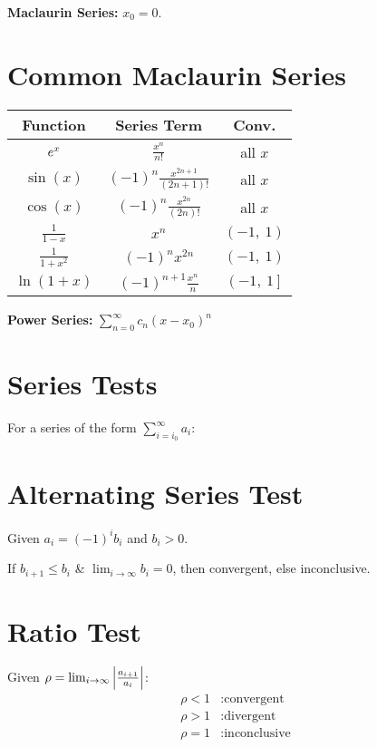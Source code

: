 \documentclass{article}
\begin{document}
\begin{multicols}{3}
    \textbf{Maclaurin Series:} $x_0 = 0$.
    \section*{Common Maclaurin Series}
    \begin{table}[H]
        \centering
        \begin{tabular}{c | c | c}
            \toprule
            \textbf{Function}         & \textbf{Series Term}                                        & \textbf{Conv.}           \\
            \midrule
            $e^{x}$                  & $\frac{x^n}{n!}$                                            & all $x$                  \\
            $\sin{\left( x \right)}$  & $\left( -1 \right)^n \frac{x^{2n+1}}{\left( 2n+1 \right)!}$ & all $x$                  \\
            $\cos{\left( x \right)}$  & $\left( -1 \right)^n \frac{x^{2n}}{\left( 2n \right)!}$     & all $x$                  \\
            $\frac{1}{1-x}$           & $x^n$                                                       & $\left( -1,\: 1 \right)$ \\
            $\frac{1}{1+x^2}$         & $\left( -1 \right)^n x^{2n}$                                & $\left( -1,\: 1 \right)$ \\
            $\ln{\left( 1+x \right)}$ & $\left( -1 \right)^{n+1} \frac{x^n}{n}$                     & $\left( -1,\: 1 \right]$ \\
            \bottomrule
        \end{tabular}
    \end{table}
    \textbf{Power Series:} $\sum_{n=0}^{\infty} c_n\left( x-x_0 \right)^n$
    \section*{Series Tests}
    For a series of the form $\displaystyle\sum_{i=i_0}^\infty a_i$:
    \section*{Alternating Series Test}
    Given $a_i = \left( -1 \right)^i b_i$ and $b_i>0$.

    If $b_{i+1}\leqslant b_i$ \& $\lim_{i\to\infty}b_i=0$, then
    convergent, else inconclusive.
    \section*{Ratio Test}
    Given $\rho = \lim_{i\to\infty}\abs{\frac{a_{i+1}}{a_i}}$:
    \begin{align*}
        \rho < 1 & : \text{convergent}   \\
        \rho > 1 & : \text{divergent}    \\
        \rho = 1 & : \text{inconclusive}
    \end{align*}

\end{multicols}
\end{document}
